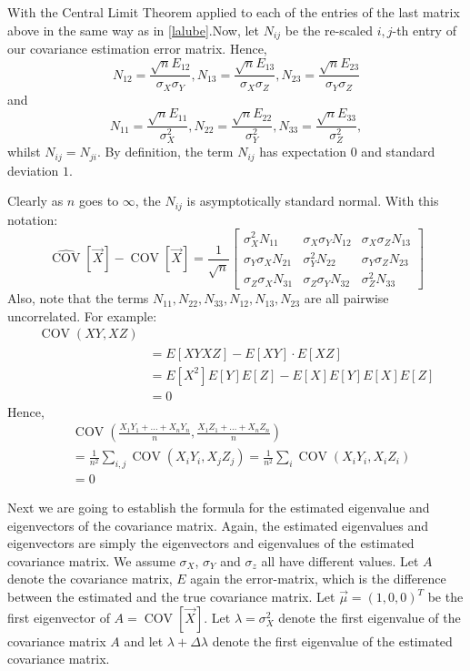 \documentclass[12pt]{amsart}
\theoremstyle{definition}
\DeclareMathOperator{\Cov}{COV}
\numberwithin{equation}{section}
\numberwithin{equation}{section}
\theoremstyle{remark}
\numberwithin{equation}{section}
\begin{document}
With the Central Limit Theorem applied to each of the entries of the last matrix above in the same way as in \ref{lalube}.Now, let $N_{ij}$ be the re-scaled $i,j$-th entry of our covariance estimation error matrix. Hence, $$N_{12}=\frac{\sqrt{n}E_{12}}{\sigma_X\sigma_Y},N_{13}=\frac{\sqrt{n}E_{13}}{\sigma_X\sigma_Z},N_{23}=\frac{\sqrt{n}E_{23}}{\sigma_Y\sigma_Z}$$
and
$$N_{11}=\frac{\sqrt{n}E_{11}}{\sigma^{2}_{X}},N_{22}=\frac{\sqrt{n}E_{22}}{\sigma^{2}_{Y}},N_{33}=\frac{\sqrt{n}E_{33}}{\sigma^{2}_{Z}},$$
whilst $N_{ij}=N_{ji}$.  By definition, the term $N_{ij}$ has expectation $0$ and standard deviation $1$.

Clearly as $n$ goes to $\infty$, the $N_{ij}$ is asymptotically standard normal.
With this notation:
\begin{equation}
\label{Covapprox}\hat{\Cov}[\vec{X}]-\Cov[\vec{X}]=
\frac{1}{\sqrt{n}}
\left[
\begin{array}{ccccccccc}
\sigma^{2}_{X}N_{11}&\sigma_X\sigma_YN_{12}&
\sigma_X\sigma_ZN_{13}\\
\sigma_Y\sigma_XN_{21}&\sigma^{2}_{Y}N_{22}&
\sigma_{Y}\sigma_{Z}N_{23}\\
\sigma_Z\sigma_XN_{31}&\sigma_Z\sigma_YN_{32}&
\sigma^{2}_{Z}N_{33}
\end{array}
\right]
\end{equation}
Also, note that the terms $N_{11},N_{22},N_{33},N_{12},N_{13},N_{23}$ are all pairwise uncorrelated. For example:
\begin{align*}
\Cov(XY,XZ)\\
&=E[XYXZ]-E[XY]\cdot E[XZ] \\
&=E[X^2]E[Y]E[Z]-E[X]E[Y]E[X]E[Z] \\
&=0
\end{align*}
Hence,
\begin{align*}
&\Cov\left(\frac{X_1Y_1+\ldots+X_nY_n}{n},\frac{X_1Z_1+\ldots+X_nZ_n}{n}
\right)\\
&=\frac{1}{n^2}\sum_{i,j}\Cov(X_iY_i,X_jZ_j)=
\frac{1}{n^2}\sum_{i}\Cov(X_iY_i,X_iZ_i)\\
&=0
\end{align*}

Next we are going to establish the formula for the estimated eigenvalue and eigenvectors of the covariance matrix. Again, the estimated eigenvalues and eigenvectors are simply the eigenvectors and eigenvalues of the estimated covariance matrix. We assume $\sigma_X$, $\sigma_Y$ and $\sigma_z$ all have different values. Let $A$ denote the covariance matrix, $E$ again the error-matrix, which is the difference between the estimated and the true covariance matrix. Let $\vec{\mu}=(1,0,0)^T$ be the first eigenvector of $A=\Cov[\vec{X}]$. Let $\lambda=\sigma_X^2$ denote the first eigenvalue of the covariance matrix $A$ and let $\lambda+\Delta\lambda$ denote the first eigenvalue of the estimated covariance matrix.
\end{document}

